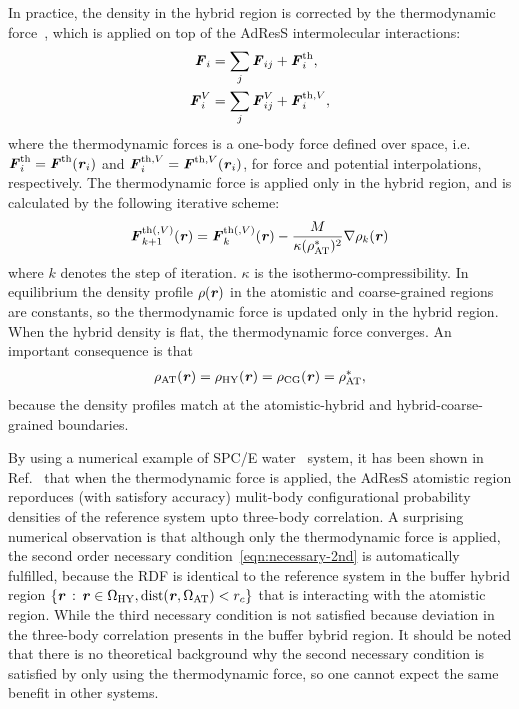 \documentclass[epjST]{svjour}
\newcommand{\vect}[1]{\textbf{\textit{#1}}}
\newcommand{\dist}[0]{\textrm {dist}}
\newcommand{\AT}[0]{\textrm{AT}}
\newcommand{\HY}[0]{\textrm{HY}}
\newcommand{\CG}[0]{\textrm{CG}}
\newcommand{\moleidxone}[0]{i}
\newcommand{\moleidxtwo}[0]{j}
\newcommand{\thf}{{\textrm{th}}}
\begin{document}
In practice, the density in the hybrid region is corrected by the
thermodynamic force~\cite{fritsch2012adaptive}, which is applied on top of the AdResS intermolecular interactions:
\begin{align}\label{eqn:thf-f}
  \vect F_\moleidxone &= \sum_\moleidxtwo \vect F_{\moleidxone\moleidxtwo}  + \vect F_\moleidxone^\thf,  \\\label{eqn:thf-p}
  \vect F^V_\moleidxone& = \sum_\moleidxtwo \vect F^V_{\moleidxone\moleidxtwo} + \vect F_\moleidxone^{\thf,V},
\end{align}
where the thermodynamic forces is a one-body force defined over space,
i.e.~$\vect F^\thf_i = \vect F^\thf(\vect r_\moleidxone)$ and $\vect F^{\thf, V}_\moleidxone = \vect F^{\thf,V}(\vect r_\moleidxone)$,
for force and potential interpolations, respectively.
The thermodynamic force is applied only in the hybrid region, and is
calculated by the following iterative scheme:
\begin{align}\label{eqn:tfi}
  \vect F_{k+1}^{\thf(, V)} (\vect r) = \vect F_k^{\thf(, V)} (\vect r)-
  \frac{M}{\kappa(\rho^\ast_\AT)^2} \nabla\rho_k(\vect r)
\end{align}
where $k$ denotes the step of iteration. $\kappa$ is the
isothermo-compressibility. In equilibrium the density profile $\rho(\vect r)$ in the
atomistic and coarse-grained regions are constants, so the thermodynamic force
is updated only in the hybrid region. When the hybrid density is flat, the thermodynamic
force converges. An important consequence is that
\begin{align}
  \rho_\AT(\vect r) = \rho_\HY(\vect r) = \rho_\CG(\vect r) = \rho_\AT^\ast,
\end{align}
because the density profiles match at the atomistic-hybrid and
hybrid-coarse-grained boundaries.

By using a numerical example of SPC/E water~\cite{berendsen1987missing}
system, it has been shown in Ref.~\cite{wang2013grand} that when the
thermodynamic force is applied, the AdResS atomistic region reporduces (with satisfory accuracy)
mulit-body configurational probability densities of the reference system
upto three-body correlation.
A surprising numerical observation is that although
only the thermodynamic force is applied, the second order necessary condition~\eqref{eqn:necessary-2nd}
is automatically fulfilled, because the RDF is identical to the reference system in the buffer hybrid region
$\{\vect r \,:\, \vect r \in\Omega_\HY, \dist(\vect r, \Omega_\AT) < r_c\}$ that is interacting with
the atomistic region. While the third necessary condition is not satisfied because deviation
in the three-body correlation presents in the buffer bybrid region.
It should be noted that there is no theoretical background why the second necessary
condition is satisfied by only using the thermodynamic force,
so one cannot expect the same benefit in other systems.
\end{document}
